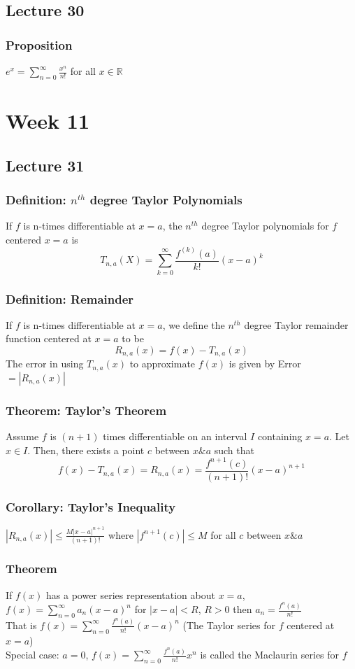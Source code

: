 \documentclass[12pt, letterpaper]{article}
\begin{document}
\subsection{Lecture 30}
\subsubsection{Proposition}
$e^x = \displaystyle\sum_{n=0}^{\infty}\frac{x^n}{n!}$ for all $x\in\mathbb{R}$

\section{Week 11} 
\subsection{Lecture 31}
\subsubsection{Definition: $n^{th}$ degree Taylor Polynomials}
If $f$ is n-times differentiable at $x=a$, the $n^{th}$ degree Taylor polynomials for $f$ centered $x=a$ is 
\[T_{n,a}(X) = \sum_{k=0}^{\infty}\frac{f^{(k)}(a)}{k!}(x-a)^k\]
\subsubsection{Definition: Remainder}
If $f$ is n-times differentiable at $x=a$, we define the $n^{th}$ degree Taylor remainder function centered at $x=a$ to be 
\[R_{n,a}(x) = f(x) - T_{n,a}(x)\]
The error in using $T_{n,a}(x)$ to approximate $f(x)$ is given by Error$=|R_{n,a}(x)|$
\subsubsection{Theorem: Taylor's Theorem}
Assume $f$ is $(n+1)$ times differentiable on an interval $I$ containing $x=a$. Let $x\in I$. Then, there exists
a point $c$ between $x\& a$ such that
\[f(x)-T_{n,a}(x) = R_{n,a}(x) = \frac{f^{n+1}(c)}{(n+1)!}(x-a)^{n+1}\]
\subsubsection{Corollary: Taylor's Inequality}
$|R_{n,a}(x)| \leq \displaystyle\frac{M|x-a|^{n+1}}{(n+1)!}$ where $|f^{n+1}(c)|\leq M$ for all $c$ between $x\& a$
\subsubsection{Theorem}
If $f(x)$ has a power series representation about $x=a$, $f(x) = \displaystyle\sum_{n=0}^{\infty}a_n(x-a)^n$ for $|x-a|<R$, $R>0$ then $a_n=\displaystyle\frac{f^{n}(a)}{n!}$ \\
That is $f(x) = \displaystyle\sum_{n=0}^{\infty}\frac{f^{n}(a)}{n!}(x-a)^n$ (The Taylor series for $f$ centered at $x=a$) \\
Special case: $a=0$, $f(x)=\displaystyle\sum_{n=0}^{\infty}\frac{f^{n}(a)}{n!}x^n$ is called the Maclaurin series for $f$ 
\end{document}

